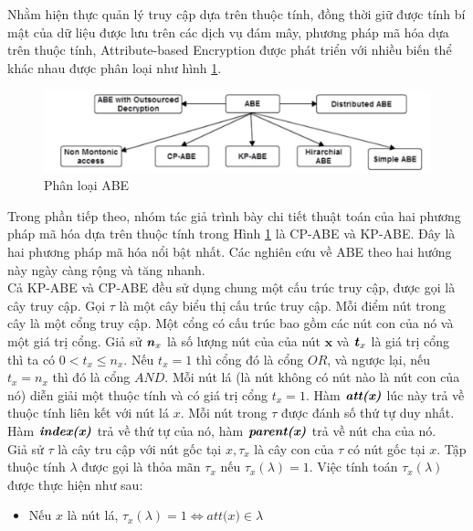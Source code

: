 \indent Nhằm hiện thực quản lý truy cập dựa trên thuộc tính, đồng thời giữ được tính bí
mật của dữ liệu được lưu trên các dịch vụ đám mây, phương pháp mã hóa dựa trên thuộc tính, Attribute-based Encryption được phát triển với nhiều biến thể khác nhau được phân
loại như hình \ref{fig:chap2-abe-classified}.
\begin{figure}
    \centering
    \includegraphics[scale=0.5]{graphics/chapter-2/chap2-abe-classified.png}
    \caption{Phân loại ABE \cite{kumar2015enhanced}}
    \label{fig:chap2-abe-classified}
\end{figure}
Trong phần tiếp theo, nhóm tác giả trình bày chi tiết thuật toán của hai phương
pháp mã hóa dựa trên thuộc tính trong Hình \ref{fig:chap2-abe-classified} là CP-ABE và KP-ABE. Đây là hai
phương pháp mã hóa nổi bật nhất. Các nghiên cứu về ABE theo hai hướng này ngày
càng rộng và tăng nhanh. \\
\indent Cả KP-ABE và CP-ABE đều sử dụng chung một cấu trúc truy cập, được gọi là
cây truy cập. Gọi $\tau $ là một cây biểu thị cấu trúc truy cập. Mỗi điểm nút trong cây là một cổng truy cập. Một cổng có cấu trúc bao gồm các nút con của nó và một giá trị cổng. Giả sử $\textbf{\textit{n}}_x$ là số lượng nút của của nút $\textbf{x}$ và $\textbf{\textit{t}}_x$ là giá trị cổng thì ta có $0 < \textit{t}_x \leq \textit{n}_x$. Nếu $\textit{t}_x = 1$ thì cổng đó là cổng $OR$, và ngược lại, nếu $\textit{t}_x = \textit{n}_x$ thì đó là cổng $AND$. Mỗi nút lá (là
nút không có nút nào là nút con của nó) diễn giải một thuộc tính và có giá trị cổng $\textit{t}_x = 1$. Hàm $\textbf{\textit{att(x)}}$ lúc này trả về thuộc tính liên kết với nút lá $\textit{x}$. Mỗi nút trong $\tau$ được đánh số thứ tự duy nhất. Hàm $\textbf{\textit{index(x)}}$ trả về thứ tự của nó, hàm $\textbf{\textit{parent(x)}}$ trả về nút cha của nó.\\
\indent Giả sử $\tau$ là cây tru cập với nút gốc tại $\textit{x}, \tau_x$ là cây con của $\tau$ có nút gốc tại $\textit{x}$. Tập thuộc tính $\lambda$ được gọi là thỏa mãn $\tau_x$ nếu $\tau_x(\lambda) = 1$. Việc tính toán $\tau_x(\lambda)$ được thực hiện như sau:
\begin{itemize}
    \item Nếu $\textit{x}$ là nút lá, $\tau_x(\lambda) = 1 \iff \textit{att(x)} \in \lambda$
\end{itemize}